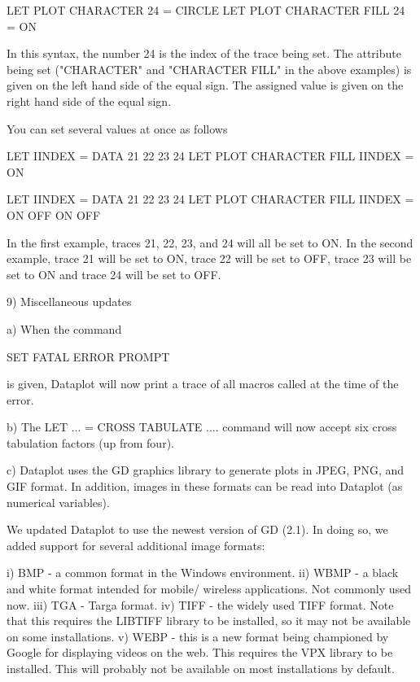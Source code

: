          LET PLOT CHARACTER      24 = CIRCLE
         LET PLOT CHARACTER FILL 24 = ON

    In this syntax, the number 24 is the index of the trace being
    set.  The attribute being set ("CHARACTER" and "CHARACTER FILL"
    in the above examples) is given on the left hand side of the
    equal sign.  The assigned value is given on the right hand side
    of the equal sign.

    You can set several values at once as follows

        LET IINDEX = DATA 21 22 23 24
        LET PLOT CHARACTER FILL IINDEX = ON

        LET IINDEX = DATA 21 22 23 24
        LET PLOT CHARACTER FILL IINDEX = ON OFF ON OFF

    In the first example, traces 21, 22, 23, and 24 will all be
    set to ON.  In the second example, trace 21 will be set to ON,
    trace 22 will be set to OFF, trace 23 will be set to ON and
    trace 24 will be set to OFF.

 9) Miscellaneous updates

    a) When the command 

         SET FATAL ERROR PROMPT

       is given, Dataplot will now print a trace of all macros called
       at the time of the error.

    b) The LET ... = CROSS TABULATE .... command will now accept six
       cross tabulation factors (up from four).

    c) Dataplot uses the GD graphics library to generate plots
       in JPEG, PNG, and GIF format.  In addition, images in these
       formats can be read into Dataplot (as numerical variables).

       We updated Dataplot to use the newest version of GD (2.1).
       In doing so, we added support for several additional
       image formats:

           i) BMP  - a common format in the Windows environment.
          ii) WBMP - a black and white format intended for mobile/
                     wireless applications.  Not commonly used
                     now.
         iii) TGA  - Targa format.
          iv) TIFF - the widely used TIFF format.  Note that this
                     requires the LIBTIFF library to be installed,
                     so it may not be available on some installations.
           v) WEBP - this is a new format being championed by Google
                     for displaying videos on the web.  This requires
                     the VPX library to be installed.  This will
                     probably not be available on most installations
                     by default.

